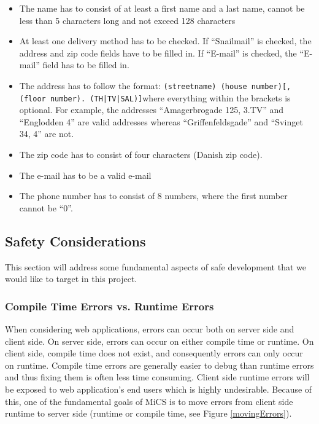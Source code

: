 		\begin{itemize}
			\item The name has to consist of at least a first name and a last name, cannot be less than 5 characters long and not exceed 128 characters
			\item At least one delivery method has to be checked. If “Snailmail” is checked, the address and zip code fields have to be filled in. If “E-mail” is checked, the “E-mail” field has to be filled in.
			\item The address has to follow the format: \newline\newline \texttt{(streetname) (house number)[, (floor number). (TH|TV|SAL)]}\newline\newline where everything within the brackets is optional. For example, the addresses ``Amagerbrogade 125, 3.TV'' and ``Englodden 4'' are valid addresses whereas ``Griffenfeldsgade'' and ``Svinget 34, 4'' are not.
			\item The zip code has to consist of four characters (Danish zip code).
			\item The e-mail has to be a valid e-mail
			\item The phone number has to consist of 8 numbers, where the first number cannot be “0”.
		\end{itemize}


	\subsection{Safety Considerations} %
	\label{sub:safety_considerations}
		This section will address some fundamental aspects of safe development that we would like to target in this project.

		\subsubsection{Compile Time Errors vs. Runtime Errors} %
		\label{ssub:compile_time_errors_vs_runtime_errors}
			
			When considering web applications, errors can occur both on server side and client side. On server side, errors can occur on either compile time or runtime. On client side, compile time does not exist, and consequently errors can only occur on runtime.
			Compile time errors are generally easier to debug than runtime errors and thus fixing them is often less time consuming. Client side runtime errors will be exposed to web application's end users which is highly undesirable. Because of this, one of the fundamental goals of MiCS is to move errors from client side runtime to server side (runtime or compile time, see Figure \ref{movingErrors}).


